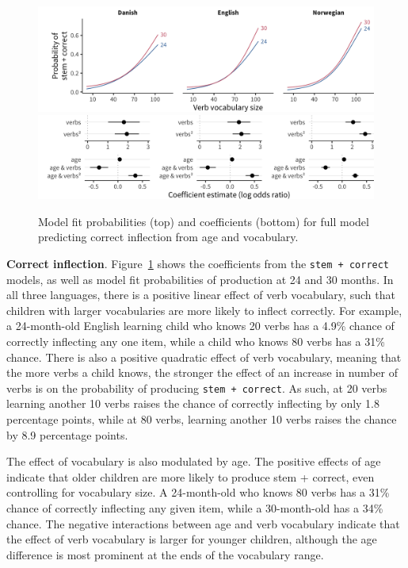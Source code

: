 \documentclass[
   11pt,
       ]{book}
\begin{document}
\begin{figure}

{\centering \includegraphics[width=\textwidth]{03-cdi-overreg/plots/correct-traj} \includegraphics[width=\textwidth]{03-cdi-overreg/plots/correct-coef} 

}

\caption{Model fit probabilities (top) and coefficients (bottom) for full model predicting correct inflection from age and vocabulary.}\label{fig:overreg-correct}
\end{figure}

\textbf{Correct inflection}. Figure~\ref{fig:overreg-correct} shows the coefficients from the \texttt{stem\ +\ correct} models, as well as model fit probabilities of production at 24 and 30 months. In all three languages, there is a positive linear effect of verb vocabulary, such that children with larger vocabularies are more likely to inflect correctly. For example, a 24-month-old English learning child who knows 20 verbs has a 4.9\% chance of correctly inflecting any one item, while a child who knows 80 verbs has a 31\% chance. There is also a positive quadratic effect of verb vocabulary, meaning that the more verbs a child knows, the stronger the effect of an increase in number of verbs is on the probability of producing \texttt{stem\ +\ correct}. As such, at 20 verbs learning another 10 verbs raises the chance of correctly inflecting by only 1.8 percentage points, while at 80 verbs, learning another 10 verbs raises the chance by 8.9 percentage points.

The effect of vocabulary is also modulated by age. The positive effects of age indicate that older children are more likely to produce stem + correct, even controlling for vocabulary size. A 24-month-old who knows 80 verbs has a 31\% chance of correctly inflecting any given item, while a 30-month-old has a 34\% chance. The negative interactions between age and verb vocabulary indicate that the effect of verb vocabulary is larger for younger children, although the age difference is most prominent at the ends of the vocabulary range.
\end{document}

